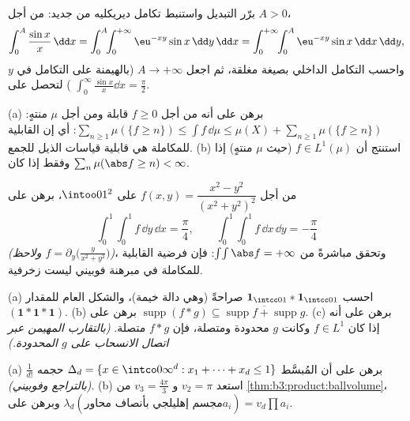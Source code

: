 \begin{exercise}[$\star$]\label{exo:b3:product:2}
برّر التبديل واستنبط تكامل ديريكليه من جديد: من أجل $A > 0$،
\[
\int_0^A\frac{\sin x}x\,\dd x
= \int_0^A\!\!\int_0^{+\infty}\eu^{-xy}\sin x\,\dd y\,\dd x
= \int_0^{+\infty}\!\!\int_0^A \eu^{-xy}\sin x\,\dd x\,\dd y,
\]
واحسب التكامل الداخلي بصيغة مغلقة، ثم اجعل $A \to
+\infty$ (بالهيمنة
على التكامل في $y$) لتحصل على $\int_0^\infty\frac{\sin x}x\dd x = \frac\pi2$.
\end{exercise}

\begin{exercise}[$\star\star$]\label{exo:b3:product:3}
(a) برهن على أنه من أجل $f \geq 0$ قابلة  ومن أجل $\mu$
منتهٍ: $\sum_{n\geq1}\mu(\{f \geq n\}) \leq \int f\,\dd\mu \leq
\mu(X) + \sum_{n\geq1}\mu(\{f\geq n\})$: أي إن القابلية للمكاملة هي قابلية قياسات الذيل
للجمع.
(b) استنتج أن $f \in L^1(\mu)$ (حيث $\mu$ منتهٍ) إذا وفقط إذا
كان $\sum_n\mu(\abs f \geq n) < \infty$.
\end{exercise}

\begin{exercise}[$\star\star$]\label{exo:b3:product:4}
من أجل $f(x, y) = \dfrac{x^2 - y^2}{(x^2 + y^2)^2}$ على $\intoo01^2$، برهن على
\[
\int_0^1\!\!\int_0^1 f\,\dd y\,\dd x = \frac\pi4,
\qquad
\int_0^1\!\!\int_0^1 f\,\dd x\,\dd y = -\frac\pi4
\]
\emph{(ولاحظ $f = \partial_y\bigl(\frac{y}{x^2+y^2}\bigr)$)}، وتحقق مباشرةً من $\int\!\int\abs f = +\infty$: فإن فرضية
القابلية للمكاملة في مبرهنة فوبيني ليست زخرفية.
\end{exercise}

\begin{exercise}[$\star\star$]\label{exo:b3:product:5}
(a) احسب $\mathbf 1_{\intcc01} * \mathbf 1_{\intcc01}$ صراحةً (وهي دالة خيمة)، والشكل العام للمقدار
$(\mathbf 1 * \mathbf 1 *
\mathbf 1)$.
(b) برهن على $\operatorname{supp}(f * g) \subseteq
\overline{\operatorname{supp}f + \operatorname{supp}g}$.
(c) برهن على أنه إذا كان $f \in L^1$ وكانت $g$ محدودة ومتصلة،
فإن $f * g$ متصلة. \emph{(بالتقارب المهيمن عبر اتصال الانسحاب
على $g$ المحدودة.)}
\end{exercise}

\begin{exercise}[$\star\star$]\label{exo:b3:product:6}
(a) برهن على أن المُبسَّط $\Delta_d = \{x \in \intco0\infty^d
: x_1 + \dots + x_d \leq 1\}$ حجمه $\frac1{d!}$ \emph{(بالتراجع
وفوبيني)}.
(b) استعد $v_2 = \pi$ و $v_3 = \frac{4\pi}3$ من \cref{thm:b3:product:ballvolume}، وبرهن على
$\lambda_d(\text{مجسم إهليلجي بأنصاف محاور} a_i) =
v_d\prod a_i$.
\end{exercise}

